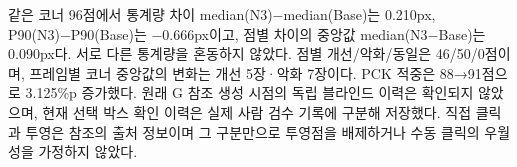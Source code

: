 \documentclass[journal,twoside,web]{ieeecolor}
\begin{document}
같은 코너 96점에서 통계량 차이 median(N3)−median(Base)는 0.210px, P90(N3)−P90(Base)는 −0.666px이고, 점별 차이의 중앙값 median(N3−Base)는 0.090px다. 서로 다른 통계량을 혼동하지 않았다. 점별 개선/악화/동일은 46/50/0점이며, 프레임별 코너 중앙값의 변화는 개선 5장·악화 7장이다. PCK 적중은 88→91점으로 3.125\%p 증가했다. 원래 G 참조 생성 시점의 독립 블라인드 이력은 확인되지 않았으며, 현재 선택 박스 확인 이력은 실제 사람 검수 기록에 구분해 저장했다. 직접 클릭과 투영은 참조의 출처 정보이며 그 구분만으로 투영점을 배제하거나 수동 클릭의 우월성을 가정하지 않았다.

\FloatBarrier
\end{document}
